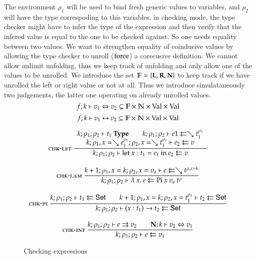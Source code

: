 The environment $\rho_1$ will be used to bind fresh generic values to variables, and $\rho_2$ will have the type correspoding to this variables. in checking mode, the type checker might have to infer the type of the expression and then verify that the infered value is equal to the one to be checked against.
So one needs equality between two values.
We want to strengthen equality of coinducive values by allowing the type checker to unroll ($\mathrm{force}$) a corecusive definition. We cannot allow unlimit unfolding, thus we keep track of unfolding and only allow one of the values to be unrolled.
We introduce the set $ \mathbb{F} = \{\mathbf{L}, \mathbf{R}, \mathbf{N} \} $ to keep track if we have unrolled the left or right value or not at all.
Thus we introduce simulataneously two judgements, the latter one operating on already unrolled values.
\[f;k\vdash v_1\Leftrightarrow v_2 \subseteq \mathbb{F} \times \mathbb{N} \times \mathrm{Val} \times \mathrm{Val} \]
\[f;k\vdash v_1{\:\leftrightarrow\:}v_2 \subseteq \mathbb{F} \times \mathbb{N} \times\mathrm{Val} \times \mathrm{Val} \]

\begin{figure}[p]

\begin{gather*}
\mbox{\sc chk-let}\ \dfrac{\begin{array}[b]{c}
k;\rho_1;\rho_2\vdash t_1\:\mathbf{Type}
\qquad
k;\rho_1;\rho_2\vdash e1\leftleftarrows\searrow t_1^{\rho_1}
\\
k;\rho_1,x=\searrow e_1^{\rho_1};\rho_2,x=\searrow t_1^{\rho_1}\vdash e_2\leftleftarrows v
\end{array}}{k;\rho_1;\rho_2\vdash\mathrm{let}\: x : t_1 = e_1 \: \mathrm{in}\:{e_2}\leftleftarrows v}
\\[2ex]
\mbox{\sc chk-lam}\ \dfrac{k+1;\rho_1,x=k;\rho_2,x=v_a\vdash e\leftleftarrows\searrow t^{\rho,x=k}}{k;\rho_1;\rho_2\vdash\lambda\: x .\:{e}\leftleftarrows\mathrm{Pi} \: x \: v_a \: t^{\rho}}
\\[2ex]
\mbox{\sc chk-pi}\ \dfrac{k;\rho_1;\rho_2\vdash t_1\leftleftarrows\mathsf{Set}
\qquad
k+1;\rho_1,x=k;\rho_2,x=t_1^{\rho_1}\vdash t_2\leftleftarrows\mathsf{Set}
}{k;\rho_1;\rho_2\vdash( x : t_1 ) \rightarrow{t_2}\leftleftarrows\mathsf{Set}}
\\[2ex]
\mbox{\sc chk-inf}\ \dfrac{k;\rho_1;\rho_2\vdash e\rightrightarrows v_2
\qquad
{\mathbf{N};k\vdash v_2\Leftrightarrow v_1}}{k;\rho_1;\rho_2\vdash e\leftleftarrows v_1}
\end{gather*}
\caption{Checking expressions}
\end{figure}

